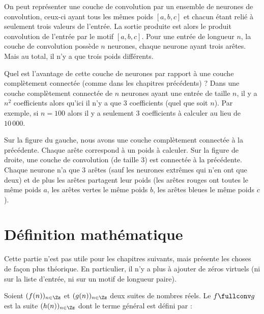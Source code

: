 \documentclass[11pt,class=report,crop=false]{standalone}
\begin{document}
On peut représenter une couche de convolution par un ensemble de neurones de convolution, 
ceux-ci ayant tous les mêmes poids $[a,b,c]$ et chacun étant relié à seulement trois valeurs de l'entrée. La sortie produite est alors le produit  convolution de l'entrée par le motif $[a,b,c]$.
Pour une entrée de longueur $n$, la couche de convolution possède $n$ neurones, chaque neurone ayant trois arêtes. Mais au total, il n'y a que trois poids différents.



Quel est l'avantage de cette couche de neurones par rapport à une couche complètement connectée (comme dans les chapitres précédents) ?
Dans une couche complètement connectée de $n$ neurones ayant une entrée de taille $n$, il y a $n^2$ coefficients alors qu'ici il n'y a que $3$ coefficients (quel que soit $n$). Par exemple, si $n=100$ alors il y a seulement $3$ coefficients à calculer au lieu de $10\,000$.


Sur la figure du gauche, nous avons une couche complètement connectée à la précédente. Chaque arête correspond à un poids à calculer. Sur la figure de droite, une couche de convolution (de taille $3$) est connectée à la précédente.
Chaque neurone n'a que $3$ arêtes (sauf les neurones extrêmes qui n'en ont que deux) et de plus les arêtes partagent leur poids (les arêtes rouges ont toutes le même poids $a$, les arêtes vertes le même poids $b$, les arêtes bleues le même poids $c$).


\section{Définition mathématique}

Cette partie  n'est pas utile pour les chapitres suivants, mais présente les choses de façon plus théorique.
En particulier, il n'y a plus à ajouter de zéros virtuels (ni sur la liste d'entrée, ni sur un motif de longueur paire). 


\begin{definition}
Soient $(f(n))_{n\in\Zz}$ et $(g(n))_{n\in\Zz}$ deux suites de nombres réels.
Le  $f \fullconv g$ est la suite $(h(n))_{n\in\Zz}$ dont le terme général est défini par :
\end{definition}
\end{document}
